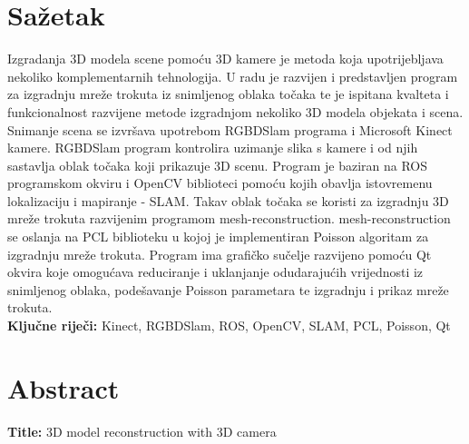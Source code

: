\newpage
\thispagestyle{empty}

\section*{Sažetak} %
\label{sec:Sažetak}


Izgradanja 3D modela scene pomoću 3D kamere je metoda koja
upotrijebljava nekoliko komplementarnih tehnologija.  U radu je razvijen
i predstavljen program za izgradnju mreže trokuta iz snimljenog oblaka
točaka te je ispitana kvalteta i funkcionalnost razvijene metode
izgradnjom nekoliko 3D modela objekata i scena.  Snimanje scena se
izvršava upotrebom RGBDSlam programa i Microsoft Kinect kamere. RGBDSlam
program kontrolira uzimanje slika s kamere i od njih sastavlja oblak
točaka koji prikazuje 3D scenu. Program je baziran na ROS programskom
okviru i OpenCV biblioteci pomoću kojih obavlja istovremenu lokalizaciju
i mapiranje - SLAM. Takav oblak točaka se koristi za izgradnju 3D mreže
trokuta razvijenim programom mesh-reconstruction.  mesh-reconstruction
se oslanja na PCL biblioteku u kojoj je implementiran Poisson algoritam
za izgradnju mreže trokuta. Program ima grafičko sučelje razvijeno
pomoću Qt okvira koje omogućava reduciranje i uklanjanje odudarajućih
vrijednosti iz snimljenog oblaka, podešavanje Poisson parametara te
izgradnju i prikaz mreže trokuta.  \\

\noindent\textbf{Ključne riječi:} Kinect, RGBDSlam, ROS, OpenCV, SLAM, PCL,
Poisson, Qt

\section*{Abstract} %
\label{sec:Abstract}
\textbf{Title:} 3D model reconstruction with 3D camera \\

